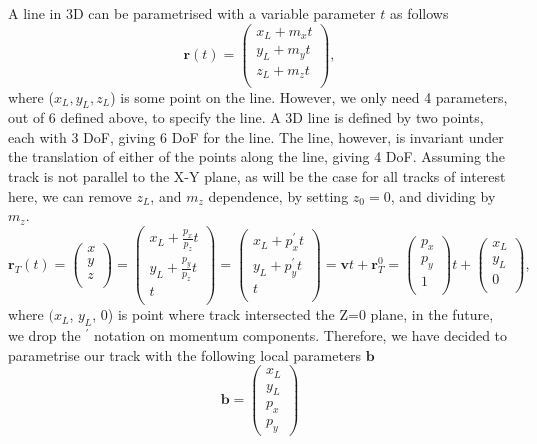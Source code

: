 \documentclass[a4paper,11pt]{article}
\begin{document}
A line in 3D can be parametrised with a variable parameter $t$ as follows
\begin{equation}
\textbf{r}(t) = \begin{pmatrix}x_L + m_x  t\\y_L + m_y t\\z_L + m_z t\\\end{pmatrix},
\end{equation}
where ($x_L, y_L, z_L$)  is some point on the line. However, we only need 4 parameters, out of 6 defined above, to specify the line. A 3D line is defined by two points, each with 3 DoF, giving 6 DoF for the line. The line, however, is invariant under the translation of either of the points along the line, giving 4 DoF. Assuming the track is not parallel to the X-Y plane, as will be the case for all tracks of interest here, we can remove $z_L$, and $m_z$ dependence, by setting $z_0=0$, and dividing by $m_z$. 
\begin{equation}
\textbf{r}_T(t) = \begin{pmatrix}x\\y\\z\\\end{pmatrix} = \begin{pmatrix}x_L + \frac{p_x}{p_z}  t\\y_L + \frac{p_y}{p_z}  t\\  t\\\end{pmatrix} = \begin{pmatrix}x_L + p_x^{'} t\\y_L + p_y^{'}  t\\  t\\\end{pmatrix}= \textbf{v}t+\textbf{r}_T^0=\begin{pmatrix}p_x\\ p_y \\  1\\\end{pmatrix}t + \begin{pmatrix}x_L \\y_L  \\  0\\\end{pmatrix},
\label{eq:track}
\end{equation}
where $(x_L$, $y_L$, $0$) is point where track intersected the Z=0 plane, in the future, we drop the $^{'}$ notation on momentum components. Therefore, we have decided to
parametrise our track with the following local parameters $\textbf{b}$
\begin{equation}
\textbf{b} = \begin{pmatrix}x_L \\y_L \\p_x \\ p_y\end{pmatrix}
\end{equation}
\end{document}
